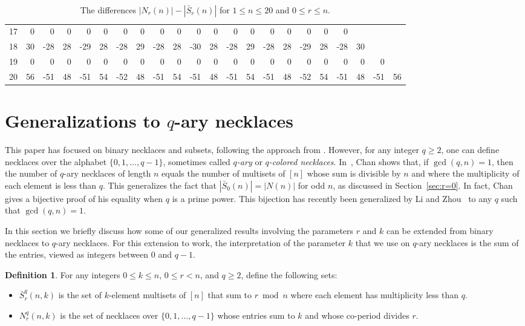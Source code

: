 \documentclass[12pt]{article}
\newcommand{\card}[1]{\left|#1\right|}
\newcommand{\bS}{\bar{S}}
\theoremstyle{definition}
\newtheorem{definition}{Definition}
\begin{document}
\begin{table}[h]
{\begin{tabular}{r|rrrrrrrrrrrrrrrrrrrrr}
17 & 0 & 0 & 0 & 0 & 0 & 0 & 0 & 0 & 0 & 0 & 0 & 0 & 0 & 0 & 0 & 0 & 0 & 0 &  &  &  \\
18 & 30 & -28 & 28 & -29 & 28 & -28 & 29 & -28 & 28 & -30 & 28 & -28 & 29 & -28 & 28 & -29 & 28 & -28 & 30 &  &  \\
19 & 0 & 0 & 0 & 0 & 0 & 0 & 0 & 0 & 0 & 0 & 0 & 0 & 0 & 0 & 0 & 0 & 0 & 0 & 0 & 0 &  \\
20 & 56 & -51 & 48 & -51 & 54 & -52 & 48 & -51 & 54 & -51 & 48 & -51 & 54 & -51 & 48 & -52 & 54 & -51 & 48 & -51 & 56
\end{tabular}}
\caption{The differences $\card{N_r(n)} - \card{\bS_r(n)}$ for $1 \leq n \leq 20$ and $0 \leq r \leq n$.}
    \label{tab:diff-sum}
\end{table}


\section{Generalizations to $q$-ary necklaces}\label{sec:q}

This paper has focused on binary necklaces and subsets, following the approach from \cite{Baker,subsetmodprime,jpl}. However, for any integer $q\ge2$, one can define necklaces over the alphabet $\{0,1,\dots,q-1\}$, sometimes called {\em $q$-ary} or {\em $q$-colored necklaces}. In~\cite{Chan}, Chan shows that, if $\gcd(q,n)=1$, then the number of $q$-ary necklaces of length $n$ equals the number of multisets of $[n]$ whose sum is divisible by $n$ and where the multiplicity of each element is less than $q$. 
This generalizes the fact that $\card{\bS_0(n)}=\card{N(n)}$ for odd $n$, as discussed in Section~\ref{sec:r=0}. 
In fact, Chan gives a bijective proof of his equality when $q$ is a prime power. This bijection has recently been generalized by Li and Zhou~\cite{LZ} to any $q$ such that $\gcd(q,n)=1$.

In this section we briefly discuss how some of our generalized results involving the parameters $r$ and $k$ can be extended from binary necklaces to $q$-ary necklaces. For this extension to work, the interpretation of the parameter $k$ that we use on $q$-ary necklaces is the sum of the entries, viewed as integers between $0$ and $q-1$. 

\begin{definition} 
For any integers $0\le k\le n$, $0\le r< n$, and $q\ge2$, define the following sets:
\begin{itemize}
    \item $\bS_r^q(n,k)$ is the set of $k$-element multisets of $[n]$ that sum to $r\bmod n$ where each element has multiplicity less than $q$.
    \item $N_r^q(n,k)$ is the set of necklaces over $\{0,1,\dots,q-1\}$ whose entries sum to $k$ and whose co-period divides $r$.
\end{itemize}
\end{definition}
\end{document}
